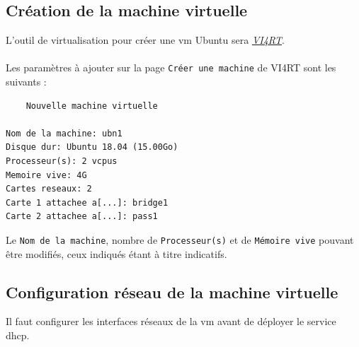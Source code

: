 \documentclass[a4paper]{article}
\begin{document}
\subsection{Création de la machine virtuelle}
L'outil de virtualisation pour créer une \acrshort{vm} Ubuntu sera \href{http://vi4rt.univ-pau.fr}{\textit{VI4RT}}.\\\\Les paramètres à ajouter sur la page \verb|Créer une machine| de VI4RT sont les suivants :
\begin{lstlisting}
    Nouvelle machine virtuelle

Nom de la machine: ubn1
Disque dur: Ubuntu 18.04 (15.00Go)
Processeur(s): 2 vcpus
Memoire vive: 4G
Cartes reseaux: 2
Carte 1 attachee a[...]: bridge1
Carte 2 attachee a[...]: pass1
\end{lstlisting}
Le \verb|Nom de la machine|, nombre de \verb|Processeur(s)| et de \verb|Mémoire vive| pouvant être modifiés, ceux indiqués étant à titre indicatifs.
\subsection{Configuration réseau de la machine virtuelle}
Il faut configurer les interfaces réseaux de la \acrshort{vm} avant de déployer le service \gls{dhcp}.
\end{document}
